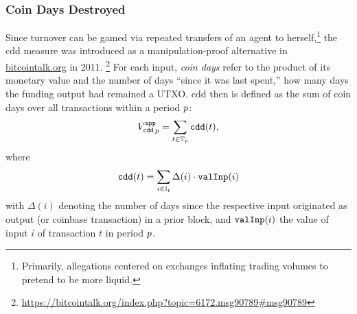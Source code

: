 

\subsubsection{Coin Days Destroyed}
\label{sec:results:sub:approx_crypto:subsub:bdd}%

Since turnover can be gamed via repeated transfers of an agent to
herself,\footnote{Primarily, allegations centered on exchanges inflating
  trading volumes to pretend to be more liquid.} %
the \Ac{cdd} measure was introduced as a manipulation-proof alternative in
\url{bitcointalk.org} in 2011.%
\footnote{\url{https://bitcointalk.org/index.php?topic=6172.msg90789\#msg90789}} %
For each input, \emph{coin days} refer to the product of its monetary value
and the number of days ``since it was last spent,'' \ie how many days the
funding output had remained a UTXO.  %
\Ac{cdd} then is defined as the sum of coin days over all transactions within
a period ${p}$:%
\begin{align}%
  \BddP = \sum_{t\in\TxP} \bdd(t),%
\end{align}%
where%
\begin{align}%
  \bdd(t) = \sum_{i\in\InpT}  \Delta(i) \cdot \valI(i)%
\end{align} %
with $\Delta(i)$ denoting the number of days since the respective input
originated as output (or coinbase transaction) in a prior block, and
$ {\mathtt{valInp}}(i)$ the value of input $i$ of transaction $t$ in period ${p}$.  %


